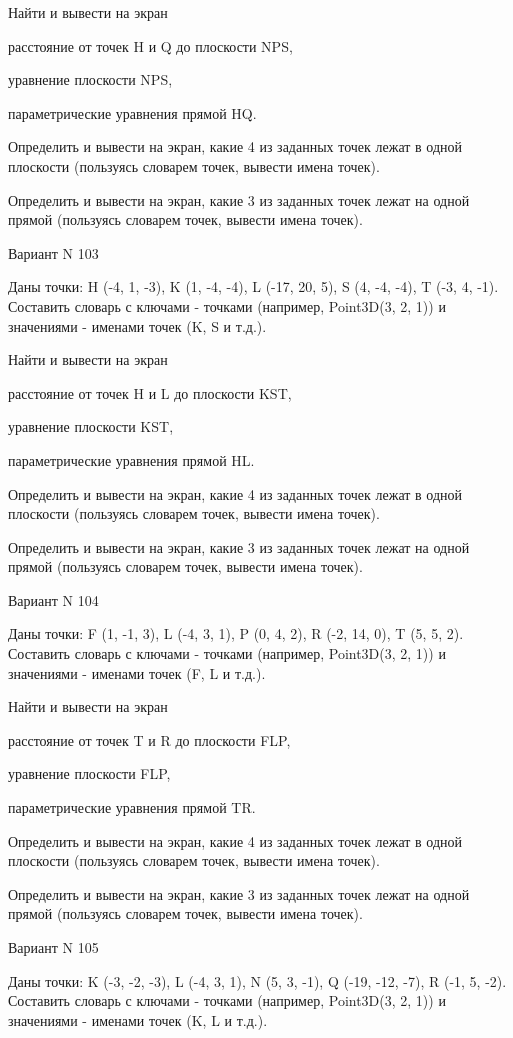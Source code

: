\documentclass[11pt]{report}
\begin{document}
Найти и вывести на экран


расстояние от точек H и Q до плоскости NPS,


уравнение плоскости NPS,


параметрические уравнения прямой HQ.


Определить и вывести на экран, какие 4 из заданных точек лежат в одной плоскости (пользуясь словарем точек, вывести имена точек).


Определить и вывести на экран, какие 3 из заданных точек лежат на одной прямой (пользуясь словарем точек, вывести имена точек).

\newpage
Вариант N 103

Даны точки: H (-4, 1, -3), K (1, -4, -4), L (-17, 20, 5), S (4, -4, -4), T (-3, 4, -1).
Составить словарь с ключами - точками (например, Point3D(3, 2, 1)) и значениями - именами точек (K, S и т.д.).


Найти и вывести на экран


расстояние от точек H и L до плоскости KST,


уравнение плоскости KST,


параметрические уравнения прямой HL.


Определить и вывести на экран, какие 4 из заданных точек лежат в одной плоскости (пользуясь словарем точек, вывести имена точек).


Определить и вывести на экран, какие 3 из заданных точек лежат на одной прямой (пользуясь словарем точек, вывести имена точек).

\newpage
Вариант N 104

Даны точки: F (1, -1, 3), L (-4, 3, 1), P (0, 4, 2), R (-2, 14, 0), T (5, 5, 2).
Составить словарь с ключами - точками (например, Point3D(3, 2, 1)) и значениями - именами точек (F, L и т.д.).


Найти и вывести на экран


расстояние от точек T и R до плоскости FLP,


уравнение плоскости FLP,


параметрические уравнения прямой TR.


Определить и вывести на экран, какие 4 из заданных точек лежат в одной плоскости (пользуясь словарем точек, вывести имена точек).


Определить и вывести на экран, какие 3 из заданных точек лежат на одной прямой (пользуясь словарем точек, вывести имена точек).

\newpage
Вариант N 105

Даны точки: K (-3, -2, -3), L (-4, 3, 1), N (5, 3, -1), Q (-19, -12, -7), R (-1, 5, -2).
Составить словарь с ключами - точками (например, Point3D(3, 2, 1)) и значениями - именами точек (K, L и т.д.).
\end{document}
